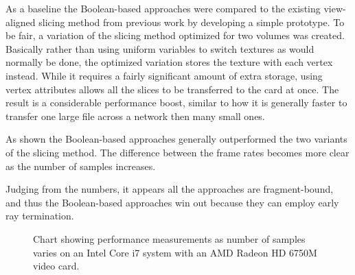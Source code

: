 \documentclass{report}
\begin{document}
As a baseline the Boolean-based approaches were compared to the existing
view-aligned slicing method from previous work by developing a simple prototype.
To be fair, a variation of the slicing method optimized for two volumes was
created.  Basically rather than using uniform variables to switch textures as
would normally be done, the optimized variation stores the texture with each
vertex instead.  While it requires a fairly significant amount of extra storage,
using vertex attributes allows all the slices to be transferred to the card at
once.  The result is a considerable performance boost, similar to how it is
generally faster to transfer one large file across a network then many small
ones.

As shown the Boolean-based approaches generally outperformed the two variants of
the slicing method.  The difference between the frame rates becomes more clear
as the number of samples increases.

Judging from the numbers, it appears all the approaches are fragment-bound, and
thus the Boolean-based approaches win out because they can employ early ray
termination.

\begin{figure}
\centering
{}
\caption{
Chart showing performance measurements as number of samples varies on an Intel
Core i7 system with an AMD Radeon HD 6750M video card.
}
\label{macbook-performance-chart}
\end{figure}
\end{document}
